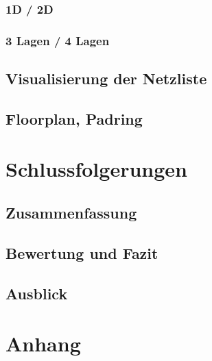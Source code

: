  \subsection{1D / 2D}
 \subsection{3 Lagen / 4 Lagen}
 \section{Visualisierung der Netzliste}
 \section{Floorplan, Padring}
 
 \chapter{Schlussfolgerungen}
 \section{Zusammenfassung}
 \section{Bewertung und Fazit}
 
 \section{Ausblick}
 
 
 \listoffigures

 \listoftables

 
 \printbibliography
 
 \chapter{Anhang}
 


